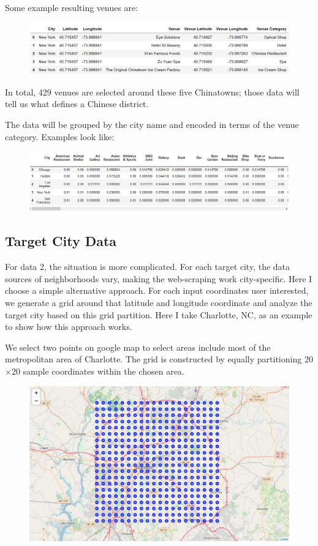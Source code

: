 \documentclass{article}
\begin{document}
Some example resulting venues are:
\begin{figure}[h!]
\includegraphics[width=1.0\textwidth]{c2.jpg}
\centering
\end{figure}

In total, 429 venues are selected around these five Chinatowns; those data will tell us what defines a Chinese district.

\newpage

The data will be grouped by the city name and encoded in terms of the venue category. Examples look like:
\begin{figure}[h!]
\includegraphics[width=1.0\textwidth]{c2_1.jpg}
\centering
\end{figure}

\subsection{Target City Data}

For data 2, the situation is more complicated.
For each target city, the data sources of neighborhoods vary, making the web-scraping work city-specific.
Here I choose a simple alternative approach.
For each input coordinates user interested, we generate a grid around that latitude and longitude coordinate and analyze the target city based on this grid partition.
Here I take Charlotte, NC, as an example to show how this approach works.

We select two points on google map to select areas include most of the metropolitan area of Charlotte. The grid is constructed by equally partitioning 20$\times$20 sample coordinates within the chosen area.
\begin{figure}[h!]
\includegraphics[width=1.0\textwidth]{c3.jpg}
\centering
\end{figure}
\end{document}
